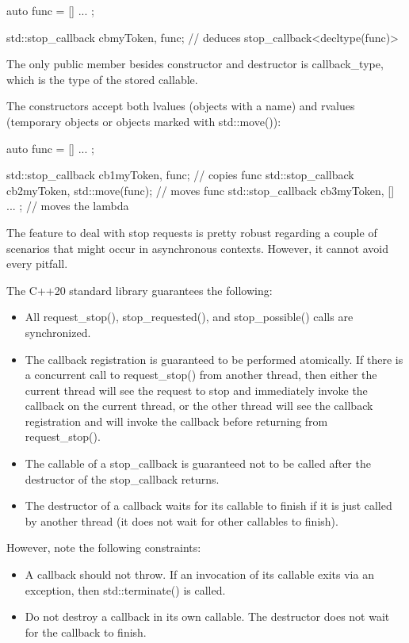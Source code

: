 \begin{cpp}
auto func = [] { ... };

std::stop_callback cb{myToken, func}; // deduces stop_callback<decltype(func)>
\end{cpp}

The only public member besides constructor and destructor is callback\_type, which is the type of the stored callable.

The constructors accept both lvalues (objects with a name) and rvalues (temporary objects or objects marked with std::move()):

\begin{cpp}
auto func = [] { ... };

std::stop_callback cb1{myToken, func}; // copies func
std::stop_callback cb2{myToken, std::move(func)}; // moves func
std::stop_callback cb3{myToken, [] { ... }}; // moves the lambda
\end{cpp}


The feature to deal with stop requests is pretty robust regarding a couple of scenarios that might occur in asynchronous contexts. However, it cannot avoid every pitfall.

The C++20 standard library guarantees the following:

\begin{itemize}
\item 
All request\_stop(), stop\_requested(), and stop\_possible() calls are synchronized.

\item 
The callback registration is guaranteed to be performed atomically. If there is a concurrent call to request\_stop() from another thread, then either the current thread will see the request to stop and immediately invoke the callback on the current thread, or the other thread will see the callback registration and will invoke the callback before returning from request\_stop().

\item 
The callable of a stop\_callback is guaranteed not to be called after the destructor of the stop\_callback returns.

\item 
The destructor of a callback waits for its callable to finish if it is just called by another thread (it does not wait for other callables to finish).
\end{itemize}

However, note the following constraints:

\begin{itemize}
\item 
A callback should not throw. If an invocation of its callable exits via an exception, then std::terminate() is called.

\item 
Do not destroy a callback in its own callable. The destructor does not wait for the callback to finish.
\end{itemize}
